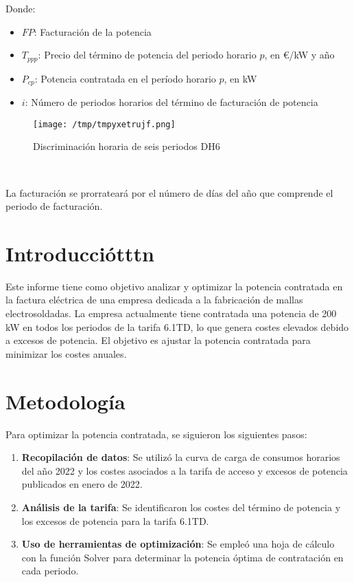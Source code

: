 \documentclass[a4paper,10pt]{article}
\begin{document}
\begin{Form}
Donde:
\begin{itemize}
    \item $FP$: Facturación de la potencia
    \item $T_{ppp}$: Precio del término de potencia del periodo horario $p$, en €/kW y año
    \item $P_{cp}$: Potencia contratada en el período horario $p$, en kW \cite{precios}
    \item $i$: Número de periodos horarios del término de facturación de potencia
\end{itemize}

\begin{figure}[H] \centering
                    
                    \texttt{[image: /tmp/tmpyxetrujf.png]}
                    \caption{Discriminación horaria de seis periodos DH6}
                    
                    \label{fig:dfassssdfsa}
                    \end{figure}
                     \

La facturación se prorrateará por el número de días del año que comprende el periodo de facturación.






\section{Introducciótttn}
Este informe tiene como objetivo analizar y optimizar la potencia contratada en la factura eléctrica de una empresa dedicada a la fabricación de mallas electrosoldadas. La empresa actualmente tiene contratada una potencia de 200 kW en todos los periodos de la tarifa 6.1TD, lo que genera costes elevados debido a excesos de potencia. El objetivo es ajustar la potencia contratada para minimizar los costes anuales.

\section{Metodología}
Para optimizar la potencia contratada, se siguieron los siguientes pasos:

\begin{enumerate}
    \item \textbf{Recopilación de datos}: Se utilizó la curva de carga de consumos horarios del año 2022 y los costes asociados a la tarifa de acceso y excesos de potencia publicados en enero de 2022.
    \item \textbf{Análisis de la tarifa}: Se identificaron los costes del término de potencia y los excesos de potencia para la tarifa 6.1TD.
    \item \textbf{Uso de herramientas de optimización}: Se empleó una hoja de cálculo con la función Solver para determinar la potencia óptima de contratación en cada periodo.
\end{enumerate}


\end{Form}
\end{document}
